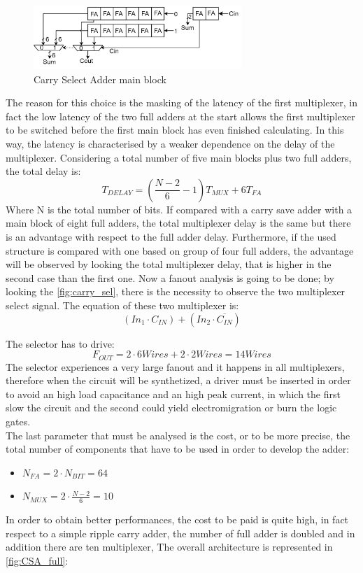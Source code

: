 \begin{figure}[htbp]
	\centering
	\includegraphics[width=0.7\textwidth]{sec2/images/csa.png}
	\caption{Carry Select Adder main block}
	\label{fig:carry_sel}
\end{figure}
\noindent
The reason for this choice is the masking of the latency of the first multiplexer, in fact the low latency of the two full adders at the start allows the first multiplexer to be switched before the first main block has even finished calculating. In this way, the latency is characterised by a weaker dependence on the delay of the multiplexer. Considering a total number of five main blocks plus two full adders, the total delay is:
\begin{equation}
	T_{DELAY} = (\frac{N-2}{6} - 1)T_{MUX} + 6T_{FA}
\end{equation}
Where N is the total number of bits.
If compared with a carry save adder with a main block of eight full adders, the total multiplexer delay is the same but there is an advantage with respect to the full adder delay. Furthermore, if the used structure is compared with one based on group of four full adders, the advantage will be observed by looking the total multiplexer delay, that is higher in the second case than the first one.
Now a fanout analysis is going to be done; by looking the \autoref{fig:carry_sel}, there is the necessity to observe the two multiplexer select signal. The equation of these two multiplexer is:
\begin{equation}
	(In_1 \cdot C_{IN}) + (In_2 \cdot \overline{C_{IN}})
\end{equation}

The selector has to drive:
\begin{equation}
	F_{OUT} = 2\cdot 6Wires + 2 \cdot 2Wires = 14Wires
\end{equation}
The selector experiences a very large fanout and it happens in all multiplexers, therefore when the circuit will be synthetized, a driver must be inserted in order to avoid an high load capacitance and an high peak current, in which the first slow the circuit and the second could yield electromigration or burn the logic gates.\\
\noindent The last parameter that must be analysed is the cost, or to be more precise, the total number of components that have to be used in order to develop the adder:
\begin{itemize}
	\item $N_{FA} = 2\cdot N_{BIT} = 64$
	\item $N_{MUX} = 2\cdot \frac{N-2}{6}  = 10$
\end{itemize}
In order to obtain better performances, the cost to be paid is quite high, in fact respect to a simple ripple carry adder, the number of full adder is doubled and in addition there are ten multiplexer, The overall architecture is represented in \autoref{fig:CSA_full}:

